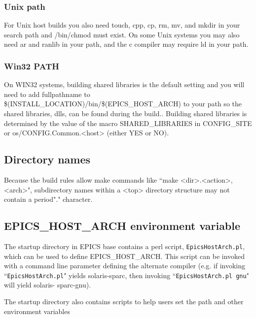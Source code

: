 \subsubsection{Unix path}

For Unix host builds you also need touch, cpp, cp, rm, mv, and mkdir in your search path and /bin/chmod must exist. On 
some Unix systems you may also need ar and ranlib in your path, and the c compiler may require ld in your path.

\subsubsection{Win32 PATH}

On WIN32 systems, building shared libraries is the default setting and you will need to add fullpathname to 
\$(INSTALL\_LOCATION)/bin/\$(EPICS\_HOST\_ARCH) to your path so the shared libraries, dlls, can be found during 
the build.. Building shared libraries is determined by the value of the macro SHARED\_LIBRARIES in CONFIG\_SITE or 
os/CONFIG.Common.\textless{}host\textgreater{} (either YES or NO).

\subsection{Directory names}

Because the build rules allow make commands like ``make \textless{}dir\textgreater{}.\textless{}action\textgreater{},\textless{}arch\textgreater{}", subdirectory names within a \textless{}top\textgreater{} 
directory structure may not contain a period"." character.

\subsection{EPICS\_HOST\_ARCH environment variable}

The startup directory in EPICS base contains a perl script, \verb|EpicsHostArch.pl|, which can be used to define 
EPICS\_HOST\_ARCH. This script can be invoked with a command line parameter defining the alternate compiler (e.g. if 
invoking ``\verb|EpicsHostArch.pl|" yields solaris-sparc, then invoking ``\verb|EpicsHostArch.pl gnu|" will yield solaris-
sparc-gnu).

The startup directory also contains scripts to help users set the path and other environment variables


